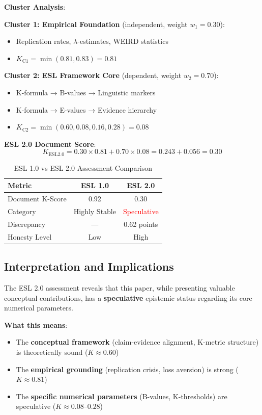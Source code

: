 \documentclass[11pt,a4paper]{article}
\begin{document}
\textbf{Cluster Analysis}:

\textbf{Cluster 1: Empirical Foundation} (independent, weight $w_1 = 0.30$):
\begin{itemize}
    \item Replication rates, $\lambda$-estimates, WEIRD statistics
    \item $K_{\text{C1}} = \min(0.81, 0.83) = 0.81$
\end{itemize}

\textbf{Cluster 2: ESL Framework Core} (dependent, weight $w_2 = 0.70$):
\begin{itemize}
    \item K-formula → B-values → Linguistic markers
    \item K-formula → E-values → Evidence hierarchy
    \item $K_{\text{C2}} = \min(0.60, 0.08, 0.16, 0.28) = 0.08$
\end{itemize}

\textbf{ESL 2.0 Document Score}:
\begin{equation}
K_{\text{ESL2.0}} = 0.30 \times 0.81 + 0.70 \times 0.08 = 0.243 + 0.056 = \mathbf{0.30}
\end{equation}

\begin{table}[h]
\centering
\caption{ESL 1.0 vs ESL 2.0 Assessment Comparison}
\label{tab:comparison}
\begin{tabular}{lcc}
\toprule
\textbf{Metric} & \textbf{ESL 1.0} & \textbf{ESL 2.0} \\
\midrule
Document K-Score & 0.92 & 0.30 \\
Category & Highly Stable & \textcolor{red}{Speculative} \\
Discrepancy & --- & 0.62 points \\
Honesty Level & Low & High \\
\bottomrule
\end{tabular}
\end{table}

\subsection{Interpretation and Implications}

The ESL 2.0 assessment reveals that this paper, while presenting valuable conceptual contributions, has a \textbf{speculative} epistemic status regarding its core numerical parameters.

\textbf{What this means}:
\begin{itemize}
    \item The \textbf{conceptual framework} (claim-evidence alignment, K-metric structure) is theoretically sound ($K \approx 0.60$)
    \item The \textbf{empirical grounding} (replication crisis, loss aversion) is strong ($K \approx 0.81$)
    \item The \textbf{specific numerical parameters} (B-values, K-thresholds) are speculative ($K \approx 0.08$--$0.28$)
\end{itemize}
\end{document}
